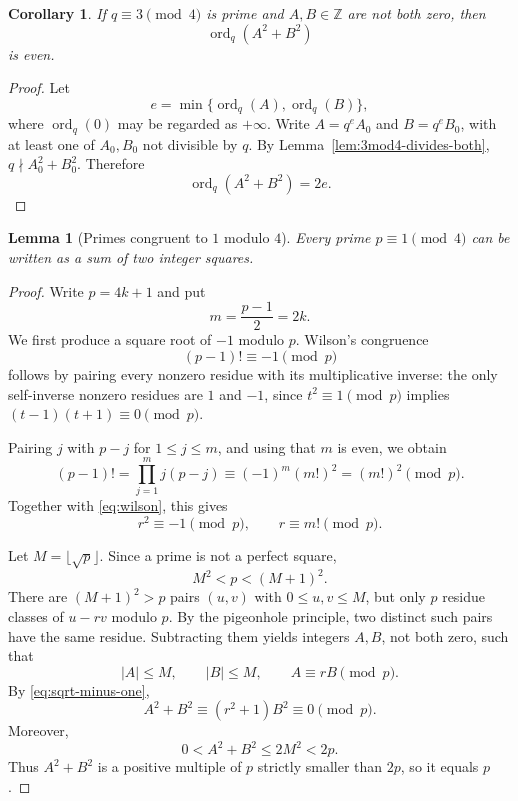 \documentclass[11pt]{article}
\numberwithin{equation}{section}
\newtheorem{lemma}[theorem]{Lemma}
\newtheorem{corollary}[theorem]{Corollary}
\theoremstyle{definition}
\theoremstyle{remark}
\newcommand{\Z}{\mathbb{Z}}
\newcommand{\ord}{\operatorname{ord}}
\begin{document}
\begin{corollary}\label{cor:valuation-even}
If $q\equiv3\pmod4$ is prime and $A,B\in\Z$ are not both zero, then
\[
 \ord_{q}(A^{2}+B^{2})
\]
is even.
\end{corollary}

\begin{proof}
Let
\[
 e=\min\{\ord_{q}(A),\ord_{q}(B)\},
\]
where $\ord_q(0)$ may be regarded as $+\infty$.  Write
$A=q^{e}A_{0}$ and $B=q^{e}B_{0}$, with at least one of $A_{0},B_{0}$
not divisible by $q$.  By Lemma~\ref{lem:3mod4-divides-both},
$q\nmid A_{0}^{2}+B_{0}^{2}$.  Therefore
\[
 \ord_{q}(A^{2}+B^{2})=2e.
\]
\end{proof}

\begin{lemma}[Primes congruent to $1$ modulo $4$]\label{lem:fermat-two-square}
Every prime $p\equiv1\pmod4$ can be written as a sum of two integer
squares.
\end{lemma}

\begin{proof}
Write $p=4k+1$ and put
\[
 m=\frac{p-1}{2}=2k.
\]
We first produce a square root of $-1$ modulo $p$.  Wilson's congruence
\begin{equation}\label{eq:wilson}
 (p-1)!\equiv-1\pmod p
\end{equation}
follows by pairing every nonzero residue with its multiplicative
inverse: the only self-inverse nonzero residues are $1$ and $-1$, since
$t^{2}\equiv1\pmod p$ implies $(t-1)(t+1)\equiv0\pmod p$.

Pairing $j$ with $p-j$ for $1\le j\le m$, and using that $m$ is even,
we obtain
\[
 (p-1)!
 =\prod_{j=1}^{m}j(p-j)
 \equiv(-1)^{m}(m!)^{2}
 =(m!)^{2}\pmod p.
\]
Together with \eqref{eq:wilson}, this gives
\begin{equation}\label{eq:sqrt-minus-one}
 r^{2}\equiv-1\pmod p,
 \qquad r\equiv m!\pmod p.
\end{equation}

Let $M=\lfloor\sqrt p\rfloor$.  Since a prime is not a perfect square,
\[
 M^{2}<p<(M+1)^{2}.
\]
There are $(M+1)^{2}>p$ pairs $(u,v)$ with
$0\le u,v\le M$, but only $p$ residue classes of $u-rv$ modulo $p$.
By the pigeonhole principle, two distinct such pairs have the same
residue.  Subtracting them yields integers $A,B$, not both zero, such
that
\[
 |A|\le M,
 \qquad |B|\le M,
 \qquad A\equiv rB\pmod p.
\]
By \eqref{eq:sqrt-minus-one},
\[
 A^{2}+B^{2}\equiv(r^{2}+1)B^{2}\equiv0\pmod p.
\]
Moreover,
\[
 0<A^{2}+B^{2}\le2M^{2}<2p.
\]
Thus $A^{2}+B^{2}$ is a positive multiple of $p$ strictly smaller than
$2p$, so it equals $p$.
\end{proof}
\end{document}
